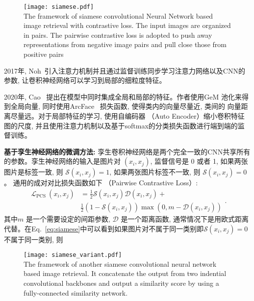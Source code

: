 \begin{figure}[!htp]
    \centering
    \texttt{[image: siamese.pdf]} \\
      {The framework of siamese convolutional Neural Network based image retrieval with contrastive loss. The input images are organized in pairs. The pairwise contrastive loss is adopted to push away representations from negative image pairs and pull close those from positive pairs }
   \label{fig:siamese}
\end{figure}

2017年, Noh~\cite{noh2017large}引入注意力机制并且通过监督训练同步学习注意力网络以及CNN的参数, 让卷积神经网络可以学习到局部的细粒度特征。 \par
2020年, Cao~\cite{cao2020unifying} 提出在模型中同时集成全局和局部的特征。作者使用GeM 池化来得到全局向量, 同时使用ArcFace~\cite{deng2019arcface} 损失函数, 使得类内的向量尽量近, 类间的
向量距离尽量远。对于局部特征的学习, 使用自编码器 （Auto Encoder）缩小卷积特征图的尺度, 并且使用注意力机制以及基于softmax的分类损失函数进行端到端的监督训练。 \par
\textbf{基于孪生神经网络的微调方法:} 孪生卷积神经网络是两个完全一致的CNN共享所有的参数。孪生神经网络的输入是图片对 $(x_i, x_j)$, 监督信号是 0 或者 1, 如果两张图片是标签一致, 则 $\mathcal{S}(x_i, x_j) = 1$, 如果两张图片标签不一致, 则 $\mathcal{S}(x_i, x_j) = 0$。 通用的成对对比损失函数如下 （Pairwise Contrastive Loss）:
\begin{equation}
    \begin{aligned}
        \mathcal{L}_{\text {PCS }}\left(x_i, x_j\right) & =\frac{1}{2} \mathcal{S}\left(x_i, x_j\right) \mathcal{D}\left(x_i, x_j\right)+ \\
        & \frac{1}{2}\left(1-\mathcal{S}\left(x_i, x_j\right)\right) \max \left(0, m-\mathcal{D}\left(x_i, x_j\right)\right)
        \end{aligned}.
        \label{eq:siamese}
\end{equation}
其中$m$ 是一个需要设定的间距参数, $\mathcal{D}$ 是一个距离函数, 通常情况下是用欧式距离代替。在Eq.~\ref{eq:siamese}中可以看到如果图片对不属于同一类别即$\mathcal{S}(x_i, x_j) = 0$ 不属于同一类别, 则 
\begin{figure}[!htp]
    \centering
    \texttt{[image: siamese\_variant.pdf]} \\
      {The framework of another siamese convolutional neural network based image retrieval. It concatenate the output from two indential convolutional backbones and output a similarity score by using a fully-connected similarity network.}
   \label{fig:siamesevariant}
\end{figure}


